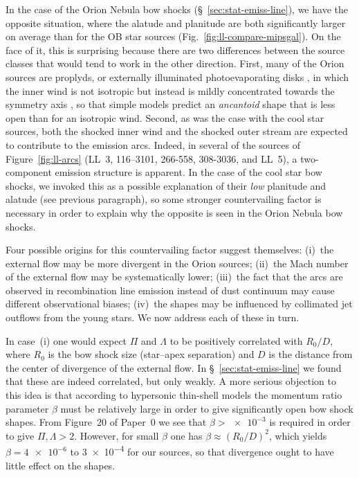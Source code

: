
In the case of the Orion Nebula bow shocks
(\S~\ref{sec:stat-emiss-line}), we have the opposite situation, where
the alatude and planitude are both significantly larger on average
than for the OB star sources (Fig.~\ref{fig:ll-compare-mipsgal}).  On
the face of it, this is surprising because there are two differences
between the source classes that would tend to work in the other
direction.  First, many of the Orion sources are proplyds, or
externally illuminated photoevaporating disks \citep{ODell:2008b}, in
which the inner wind is not isotropic but instead is mildly
concentrated towards the symmetry axis \citep{Garcia-Arredondo:2001a},
so that simple models predict an \textit{ancantoid} shape
\citep[\S~5]{Tarango-Yong:2018a} that is less open than for an
isotropic wind.  Second, as was the case with the cool star sources,
both the shocked inner wind and the shocked outer stream are expected
to contribute to the emission arcs.  Indeed, in several of the sources
of Figure~\ref{fig:ll-arcs} (LL~3, 116--3101, 266-558, 308-3036, and
LL~5), a two-component emission structure is apparent.  In the case of
the cool star bow shocks, we invoked this as a possible explanation of
their \emph{low} planitude and alatude (see previous paragraph), so
some stronger countervailing factor is necessary in order to explain
why the opposite is seen in the Orion Nebula bow shocks.


Four possible origins for this countervailing factor suggest
themselves: (i)~the external flow may be more divergent in the Orion
sources; (ii)~the Mach number of the external flow may be
systematically lower; (iii)~the fact that the arcs are observed in
recombination line emission instead of dust continuum may cause
different observational biases; (iv)~the shapes may be influenced by
collimated jet outflows from the young stars.  We now address each of
these in turn.

In case~(i) one would expect \(\Pi\) and \(\Lambda\) to be positively
correlated with \(R_0/D\), where \(R_0\) is the bow shock size
(star--apex separation) and \(D\) is the distance from the center of
divergence of the external flow.  In \S~\ref{sec:stat-emiss-line} we
found that these are indeed correlated, but only weakly.  A more
serious objection to this idea is that according to hypersonic
thin-shell models \citep{Canto:1996} the momentum ratio parameter
\(\beta\) must be relatively large in order to give significantly open bow
shock shapes.  From Figure~20 of Paper~0 we see that
\(\beta > \num{e-3}\) is required in order to give
\(\Pi, \Lambda > 2\).  However, for small \(\beta\) one has
\(\beta \approx (R_0/D)^2\), which yields \(\beta = \num{4e-6}\) to \num{3e-4} for
our sources, so that divergence ought to have little effect on the
shapes.

